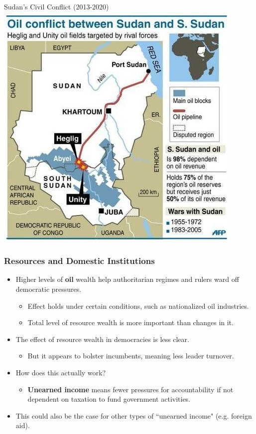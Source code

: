 \documentclass{beamer}
\begin{document}
\begin{frame}{\LARGE Sudan's Civil Conflict (2013-2020)}
	\centering
	\includegraphics[width=\textwidth,height=0.8\textheight,keepaspectratio]{sudan oil fields.jpg}
\end{frame}




\begin{frame} 
	\frametitle{\LARGE{Resources and Domestic Institutions}}
	\begin{itemize}
		
		\item Higher levels of \textbf{oil} wealth help authoritarian regimes and rulers ward off democratic pressures. \pause
		\begin{itemize}
			\item Effect holds under certain conditions, such as nationalized oil industries. \pause
			\item Total level of resource wealth is more important than changes in it. \pause
		\end{itemize}
		\item The effect of resource wealth in democracies is less clear. \pause
		\begin{itemize}
			\item But it appears to bolster incumbents, meaning less leader turnover. \pause
		\end{itemize}
		\item How does this actually work? \pause
		\begin{itemize}
			\item \textbf{Unearned income} means fewer pressures for accountability if not dependent on taxation to fund government activities. \pause
		\end{itemize}
		\item This could also be the case for other types of ``unearned income" (e.g. foreign aid).
		
	\end{itemize}
\end{frame}
\end{document}
